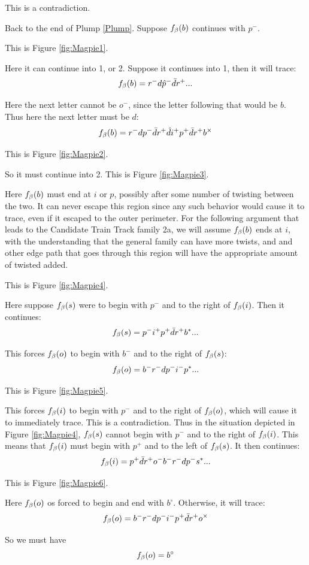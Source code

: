 This is a contradiction.

 \label{Magpie}
Back to the end of Plump \ref{Plump}. Suppose $f_\beta(b)$ continues with $p^-$.

This is Figure \ref{fig:Magpie1}.

Here it can continue into 1, or 2. Suppose it continues into 1, then it will trace:
\[
f_\beta(b) = r^- d \hat{p}^- \bar{d} r^+...
\]

Here the next letter cannot be $o^-$, since the letter following that would be $b$. Thus here the next letter must be $d$:
\[
f_\beta(b) = r^- d p^- \bar{d} r^+ \hat{d} i^+ p^+ \bar{d} r^+ b^\times
\]

This is Figure \ref{fig:Magpie2}.


So it must continue into 2. This is Figure \ref{fig:Magpie3}.

Here $f_\beta(b)$ must end at $i$ or $p$, possibly after some number of twisting between the two. It can never escape this region since any such behavior would cause it to trace, even if it escaped to the outer perimeter. For the following argument that leads to the Candidate Train Track family 2a, we will assume $f_\beta(b)$ ends at $i$, with the understanding that the general family can have more twists, and and other edge path that goes through this region will have the appropriate amount of twisted added.

This is Figure \ref{fig:Magpie4}.

Here suppose $f_\beta(s)$ were to begin with $p^-$ and to the right of $f_\beta(i)$. Then it continues:
\[
f_\beta(s) = p^- i^+ p^+ \bar{d} r^+ b^*...
\]

This forces $f_\beta(o)$ to begin with $b^-$ and to the right of $f_\beta(s)$:
\[
f_\beta(o) = b^- r^- d p^- i^- p^*...
\]

This is Figure \ref{fig:Magpie5}.

This forces $f_\beta(i)$ to begin with $p^-$ and to the right of $f_\beta(o)$, which will cause it to immediately trace. This is a contradiction. Thus in the situation depicted in Figure \ref{fig:Magpie4}, $f_\beta(s)$ cannot begin with $p^-$ and to the right of $f_\beta(i)$. This means that $f_\beta(i)$ must begin with $p^+$ and to the left of $f_\beta(s)$. It then continues:
\[
f_\beta(i) = p^+ \bar{d} r^+ o^- b^- r^- d p^- s^*...
\]

This is Figure \ref{fig:Magpie6}.

Here $f_\beta(o)$ os forced to begin and end with $b^\circ$. Otherwise, it will trace:
\[
f_\beta(o) = b^- r^- d p^- i^- p^+ \bar{d} r^+ o^\times
\]

So we must have
\[
f_\beta(o) = b^\circ
\]

